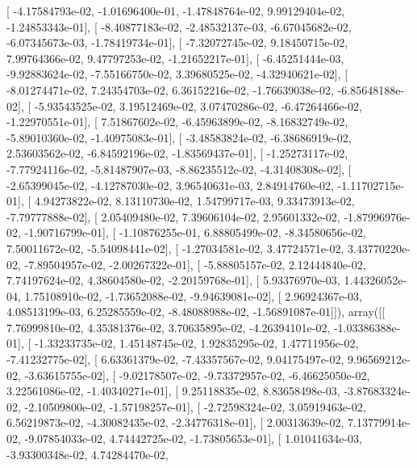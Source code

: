 \documentclass{article}
\begin{document}
       [ -4.17584793e-02,  -1.01696400e-01,  -1.47848764e-02,
          9.99129404e-02,  -1.24853343e-01],
       [ -8.40877183e-02,  -2.48532137e-03,  -6.67045682e-02,
         -6.07345673e-03,  -1.78419734e-01],
       [ -7.32072745e-02,   9.18450715e-02,   7.99764366e-02,
          9.47797253e-02,  -1.21652217e-01],
       [ -6.45251444e-03,  -9.92883624e-02,  -7.55166750e-02,
          3.39680525e-02,  -4.32940621e-02],
       [ -8.01274471e-02,   7.24354703e-02,   6.36152216e-02,
         -1.76639038e-02,  -6.85648188e-02],
       [ -5.93543525e-02,   3.19512469e-02,   3.07470286e-02,
         -6.47264466e-02,  -1.22970551e-01],
       [  7.51867602e-02,  -6.45963899e-02,  -8.16832749e-02,
         -5.89010360e-02,  -1.40975083e-01],
       [ -3.48583824e-02,  -6.38686919e-02,   2.53603562e-02,
         -6.84592196e-02,  -1.83569437e-01],
       [ -1.25273117e-02,  -7.77924116e-02,  -5.81487907e-03,
         -8.86235512e-02,  -4.31408308e-02],
       [ -2.65399045e-02,  -4.12787030e-02,   3.96540631e-03,
          2.84914760e-02,  -1.11702715e-01],
       [  4.94273822e-02,   8.13110730e-02,   1.54799717e-03,
          9.33473913e-02,  -7.79777888e-02],
       [  2.05409480e-02,   7.39606104e-02,   2.95601332e-02,
         -1.87996976e-02,  -1.90716799e-01],
       [ -1.10876255e-01,   6.88805499e-02,  -8.34580656e-02,
          7.50011672e-02,  -5.54098441e-02],
       [ -1.27034581e-02,   3.47724571e-02,   3.43770220e-02,
         -7.89504957e-02,  -2.00267322e-01],
       [ -5.88805157e-02,   2.12444840e-02,   7.74197624e-02,
          4.38604580e-02,  -2.20159768e-01],
       [  5.93376970e-03,   1.44326052e-04,   1.75108910e-02,
         -1.73652088e-02,  -9.94639081e-02],
       [  2.96924367e-03,   4.08513199e-03,   6.25285559e-02,
         -8.48088988e-02,  -1.56891087e-01]]), array([[  7.76999810e-02,   4.35381376e-02,   3.70635895e-02,
         -4.26394101e-02,  -1.03386388e-01],
       [ -1.33233735e-02,   1.45148745e-02,   1.92835295e-02,
          1.47711956e-02,  -7.41232775e-02],
       [  6.63361379e-02,  -7.43357567e-02,   9.04175497e-02,
          9.96569212e-02,  -3.63615755e-02],
       [ -9.02178507e-02,  -9.73372957e-02,  -6.46625050e-02,
          3.22561086e-02,  -1.40340271e-01],
       [  9.25118835e-02,   8.83658498e-03,  -3.87683324e-02,
         -2.10509800e-02,  -1.57198257e-01],
       [ -2.72598324e-02,   3.05919463e-02,   6.56219873e-02,
         -4.30082435e-02,  -2.34776318e-01],
       [  2.00313639e-02,   7.13779914e-02,  -9.07854033e-02,
          4.74442725e-02,  -1.73805653e-01],
       [  1.01041634e-03,  -3.93300348e-02,   4.74284470e-02,
\end{document}
